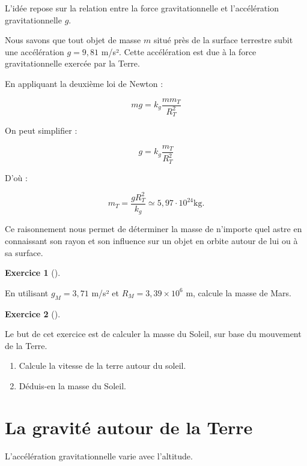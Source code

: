 \documentclass[
  letterpaper,
  DIV=11,
  numbers=noendperiod]{scrartcl}
\providecommand{\tightlist}{%
  \setlength{\itemsep}{0pt}\setlength{\parskip}{0pt}}\usepackage{longtable,booktabs,array}
\theoremstyle{definition}
\newtheorem{exercise}{Exercice}[section]
\theoremstyle{definition}
\theoremstyle{definition}
\theoremstyle{remark}
\begin{document}
L'idée repose sur la relation entre la force gravitationnelle et
l'accélération gravitationnelle \(g\).

Nous savons que tout objet de masse \(m\) situé près de la surface
terrestre subit une accélération \(g = 9,81\) m/s². Cette accélération
est due à la force gravitationnelle exercée par la Terre.

En appliquant la deuxième loi de Newton :

\[
m g =  k_g\frac{m m_T}{R_T^2}
\]

On peut simplifier :

\[
g = k_g\frac{ m_T}{R_T^2}
\]

D'où :

\[
m_T = \frac{g R_T^2}{k_g}\simeq 5,97\cdot 10^{24}\text{kg}.
\]

Ce raisonnement nous permet de déterminer la masse de n'importe quel
astre en connaissant son rayon et son influence sur un objet en orbite
autour de lui ou à sa surface.

\begin{exercise}[]\protect\hypertarget{exr-masse-terre}{}\label{exr-masse-terre}

En utilisant \(g_M = 3,71\) m/s² et \(R_M = 3,39 \times 10^6\) m,
calcule la masse de Mars.

\end{exercise}

\begin{exercise}[]\protect\hypertarget{exr-masse-mars}{}\label{exr-masse-mars}

Le but de cet exercice est de calculer la masse du Soleil, sur base du
mouvement de la Terre.

\begin{enumerate}
\def\labelenumi{\arabic{enumi}.}
\tightlist
\item
  Calcule la vitesse de la terre autour du soleil.
\item
  Déduis-en la masse du Soleil.
\end{enumerate}

\end{exercise}

\section{La gravité autour de la
Terre}\label{la-gravituxe9-autour-de-la-terre}

L'accélération gravitationnelle varie avec l'altitude.
\end{document}
